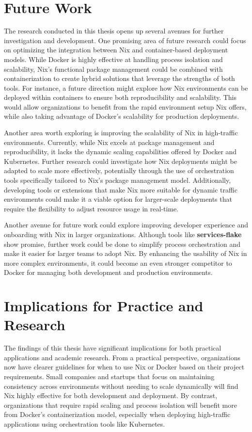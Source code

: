 \section{Future Work}
The research conducted in this thesis opens up several avenues for further investigation
and development. One promising area of future research could focus on optimizing the
integration between Nix and container-based deployment models. While Docker is highly
effective at handling process isolation and scalability, Nix’s functional package
management could be combined with containerization to create hybrid solutions that
leverage the strengths of both tools. For instance, a future direction might explore
how Nix environments can be deployed within containers to ensure both reproducibility
and scalability. This would allow organizations to benefit from the rapid environment
setup Nix offers, while also taking advantage of Docker’s scalability for production
deployments.

Another area worth exploring is improving the scalability of Nix in high-traffic
environments. Currently, while Nix excels at package management and reproducibility,
it lacks the dynamic scaling capabilities offered by Docker and Kubernetes. Further
research could investigate how Nix deployments might be adapted to scale more effectively,
potentially through the use of orchestration tools specifically tailored to Nix’s package
management model. Additionally, developing tools or extensions that make Nix more suitable
for dynamic traffic environments could make it a viable option for larger-scale
deployments that require the flexibility to adjust resource usage in real-time.

Another avenue for future work could explore improving developer experience and
onboarding with Nix in larger organizations. Although tools like \textbf{services-flake}
show promise, further work could be done to simplify process orchestration and make
it easier for larger teams to adopt Nix. By enhancing the usability of Nix in more
complex environments, it could become an even stronger competitor to Docker for
managing both development and production environments.

\section{Implications for Practice and Research}
The findings of this thesis have significant implications for both practical applications
and academic research. From a practical perspective, organizations now have clearer
guidelines for when to use Nix or Docker based on their project requirements. Small
companies and startups that focus on maintaining consistency across environments without
needing to scale dynamically will find Nix highly effective for both development and
deployment. By contrast, organizations that require rapid scaling and process isolation
will benefit more from Docker’s containerization model, especially when deploying
high-traffic applications using orchestration tools like Kubernetes.

